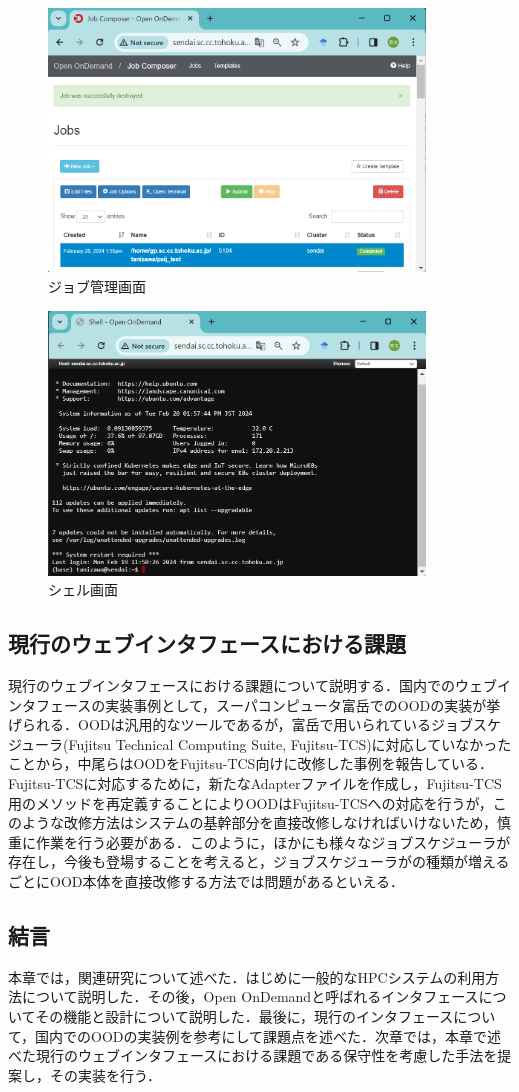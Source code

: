 \begin{figure}[tb]
    \centering
    \includegraphics[width=100mm]{./fig/jobcomposer.png}
    \caption{ジョブ管理画面}
    \label{jobcomposer}
\end{figure}

\begin{figure}[tb]
    \centering
    \includegraphics[width=100mm]{./fig/shell.png}
    \caption{シェル画面}
    \label{shell}
\end{figure}

\subsection{現行のウェブインタフェースにおける課題}
現行のウェブインタフェースにおける課題について説明する．国内でのウェブインタフェースの実装事例として，スーパコンピュータ富岳でのOODの実装が挙げられる．OODは汎用的なツールであるが，富岳で用いられているジョブスケジューラ(Fujitsu Technical Computing Suite, Fujitsu-TCS)に対応していなかったことから，中尾らはOODをFujitsu-TCS向けに改修した事例を報告している\cite{cite4}．Fujitsu-TCSに対応するために，新たなAdapterファイルを作成し，Fujitsu-TCS用のメソッドを再定義することによりOODはFujitsu-TCSへの対応を行うが，このような改修方法はシステムの基幹部分を直接改修しなければいけないため，慎重に作業を行う必要がある．このように，ほかにも様々なジョブスケジューラが存在し，今後も登場することを考えると，ジョブスケジューラがの種類が増えるごとにOOD本体を直接改修する方法では問題があるといえる．\par


\subsection{結言}
本章では，関連研究について述べた．はじめに一般的なHPCシステムの利用方法について説明した．その後，Open OnDemandと呼ばれるインタフェースについてその機能と設計について説明した．最後に，現行のインタフェースについて，国内でのOODの実装例を参考にして課題点を述べた．次章では，本章で述べた現行のウェブインタフェースにおける課題である保守性を考慮した手法を提案し，その実装を行う．\par